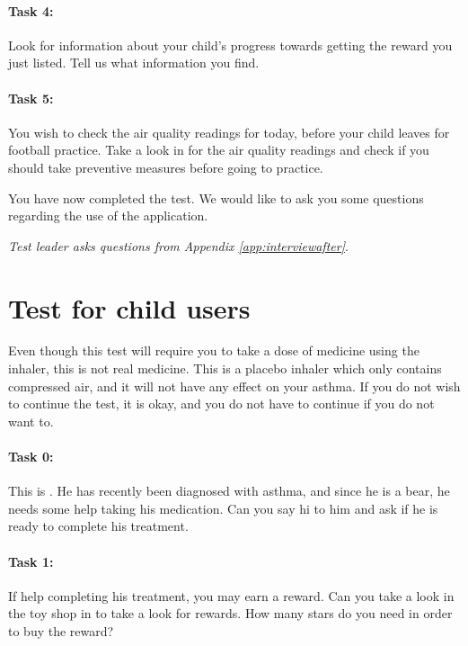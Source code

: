 \paragraph{Task 4:}

Look for information about your child's progress towards getting the reward you just listed. Tell us what information you find.

\paragraph{Task 5:}

You wish to check the air quality readings for today, before your child leaves for football practice. Take a look in for the air quality readings and check if you should take preventive measures before going to practice.  

You have now completed the test. We would like to ask you some questions regarding the use of the application. 

\emph{Test leader asks questions from Appendix \ref{app:interviewafter}}.

\section{Test for child users}
\label{sec:childtest}

Even though this test will require you to take a dose of medicine using the inhaler, this is not real medicine. This is a placebo inhaler which only contains compressed air, and it will not have any effect on your asthma. If you do not wish to continue the test, it is okay, and you do not have to continue if you do not want to. 
 
\paragraph{Task 0:}

This is \ab{}. He has recently been diagnosed with asthma, and since he is a bear, he needs some help taking his medication. Can you say hi to him and ask if he is ready to complete his treatment. 

\paragraph{Task 1:}

If help \ab{} completing his treatment, you may earn a reward. Can you take a look in the toy shop in \app{} to take a look for rewards. How many stars do you need in order to buy the reward?


